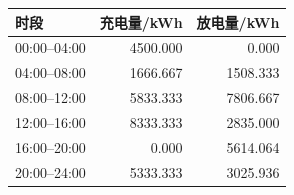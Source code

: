 \begin{tabular}{lrr}
\toprule
时段 & 充电量/kWh & 放电量/kWh \\
\midrule
00:00--04:00 & 4500.000 & 0.000 \\
04:00--08:00 & 1666.667 & 1508.333 \\
08:00--12:00 & 5833.333 & 7806.667 \\
12:00--16:00 & 8333.333 & 2835.000 \\
16:00--20:00 & 0.000 & 5614.064 \\
20:00--24:00 & 5333.333 & 3025.936 \\
\bottomrule
\end{tabular}

